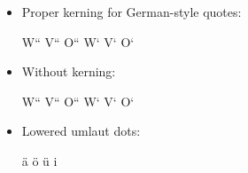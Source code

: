 \documentclass[a4paper,12pt]{article}
\begin{document}
\begin{itemize}
\item Proper kerning for German-style quotes:\par
  \begin{center}
    \Large \quotedblbase W`` \quotedblbase V`` \quotedblbase O``
    \quotesinglbase W` \quotesinglbase V` \quotesinglbase O`
  \end{center}
\item Without kerning:\par
  \begin{center}
    \Large \quotedblbase{}W{}`` \quotedblbase{}V{}`` \quotedblbase{}O{}``
    \quotesinglbase{}W{}` \quotesinglbase{}V{}` \quotesinglbase{}O{}`
  \end{center}
\item Lowered umlaut dots:
  \begin{center}
    \Large \"a \"o \"u i
  \end{center}
\end{itemize}
\end{document}
